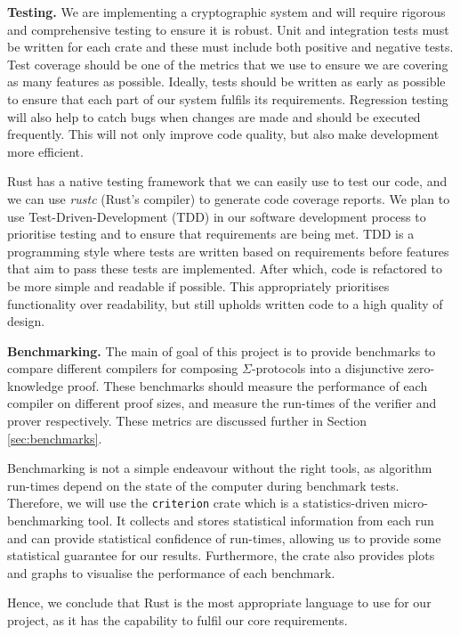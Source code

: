 \textbf{Testing.} We are implementing a cryptographic system and will require rigorous and comprehensive testing to ensure it is robust. Unit and integration tests must be written for each crate and these must include both positive and negative tests. Test coverage should be one of the metrics that we use to ensure we are covering as many features as possible. Ideally, tests should be written as early as possible to ensure that each part of our system fulfils its requirements. Regression testing will also help to catch bugs when changes are made and should be executed frequently. This will not only improve code quality, but also make development more efficient. 

Rust has a native testing framework that we can easily use to test our code, and we can use \textit{rustc} (Rust's compiler) to generate code coverage reports. We plan to use Test-Driven-Development (TDD) in our software development process to prioritise testing and to ensure that requirements are being met. TDD is a programming style where tests are written based on requirements before features that aim to pass these tests are implemented. After which, code is refactored to be more simple and readable if possible. This appropriately prioritises functionality over readability, but still upholds written code to a high quality of design. 

\textbf{Benchmarking.} The main of goal of this project is to provide benchmarks to compare different compilers for composing $\Sigma$-protocols into a disjunctive zero-knowledge proof. These benchmarks should measure the performance of each compiler on different proof sizes, and measure the run-times of the verifier and prover respectively. These metrics are discussed further in Section \ref{sec:benchmarks}. 

Benchmarking is not a simple endeavour without the right tools, as algorithm run-times depend on the state of the computer during benchmark tests. Therefore, we will use the \texttt{criterion} crate \cite{criterion} which is a statistics-driven micro-benchmarking tool. It collects and stores statistical information from each run and can provide statistical confidence of run-times, allowing us to provide some statistical guarantee for our results. Furthermore, the crate also provides plots and graphs to visualise the performance of each benchmark.

Hence, we conclude that Rust is the most appropriate language to use for our project, as it has the capability to fulfil our core requirements. 

